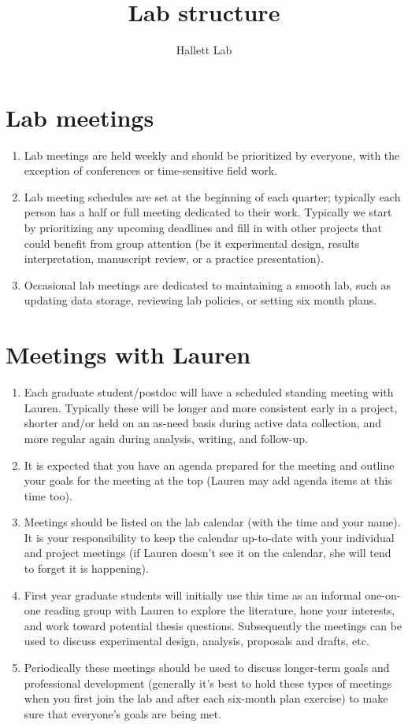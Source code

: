 \documentclass[12pt]{article}
\title{Lab structure}
\author{Hallett Lab}
\date{}
\begin{document}
\maketitle

\section{Lab meetings}
\begin{enumerate}
\item Lab meetings are held weekly and should be prioritized by everyone, with the exception of conferences or time-sensitive field work.
\item Lab meeting schedules are set at the beginning of each quarter; typically each person has a half or full meeting dedicated to their work. Typically we start by prioritizing any upcoming deadlines and fill in with other projects that could benefit from group attention (be it experimental design, results interpretation, manuscript review, or a practice presentation). 
\item Occasional lab meetings are dedicated to maintaining a smooth lab, such as updating data storage, reviewing lab policies, or setting six month plans. 
\end{enumerate}

\section{Meetings with Lauren}
\begin{enumerate}
\item Each graduate student/postdoc will have a scheduled standing meeting with Lauren. Typically these will be longer and more consistent early in a project, shorter and/or held on an as-need basis during active data collection, and more regular again during analysis, writing, and follow-up.
\item It is expected that you have an agenda prepared for the meeting and outline your goals for the meeting at the top (Lauren may add agenda items at this time too). 
\item Meetings should be listed on the lab calendar (with the time and your name). It is your responsibility to keep the calendar up-to-date with your individual and project meetings (if Lauren doesn't see it on the calendar, she will tend to forget it is happening).
\item First year graduate students will initially use this time as an informal one-on-one reading group with Lauren to explore the literature, hone your interests, and work toward potential thesis questions. Subsequently the meetings can be used to discuss experimental design, analysis, proposals and drafts, etc. 
\item Periodically these meetings should be used to discuss longer-term goals and professional development (generally it's best to hold these types of meetings when you first join the lab and after each six-month plan exercise) to make sure that everyone's goals are being met.
  \end{enumerate}
\end{document}
